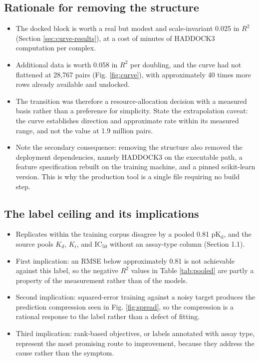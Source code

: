 \documentclass[11pt]{article}
\newcommand{\pkd}{\ensuremath{\mathrm{pK_d}}}
\begin{document}
\subsection*{Rationale for removing the structure}
\begin{itemize}
  \item The docked block is worth a real but modest and scale-invariant 0.025
        in $R^2$ (Section \ref{sec:curve-results}), at a cost of minutes of
        HADDOCK3 computation per complex.
  \item Additional data is worth 0.058 in $R^2$ per doubling, and the curve had
        not flattened at 28,767 pairs (Fig. \ref{fig:curve}), with
        approximately 40 times more rows already available and undocked.
  \item The transition was therefore a resource-allocation decision with a
        measured basis rather than a preference for simplicity. State the
        extrapolation caveat: the curve establishes direction and approximate
        rate within its measured range, and not the value at 1.9 million pairs.
  \item Note the secondary consequence: removing the structure also removed the
        deployment dependencies, namely HADDOCK3 on the executable path, a
        feature specification rebuilt on the training machine, and a pinned
        scikit-learn version. This is why the production tool is a single file
        requiring no build step.
\end{itemize}

\subsection*{The label ceiling and its implications}
\begin{itemize}
  \item Replicates within the training corpus disagree by a pooled 0.81 \pkd,
        and the source pools $K_d$, $K_i$, and IC$_{50}$ without an assay-type
        column (Section 1.1).
  \item First implication: an RMSE below approximately 0.81 is not achievable
        against this label, so the negative $R^2$ values in Table
        \ref{tab:pooled} are partly a property of the measurement rather than
        of the models.
  \item Second implication: squared-error training against a noisy target
        produces the prediction compression seen in Fig. \ref{fig:spread}, so
        the compression is a rational response to the label rather than a
        defect of fitting.
  \item Third implication: rank-based objectives, or labels annotated with
        assay type, represent the most promising route to improvement, because
        they address the cause rather than the symptom.
\end{itemize}
\end{document}
